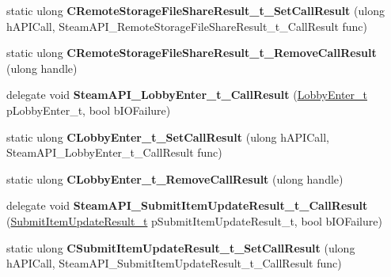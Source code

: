 \begin{DoxyCompactItemize}
static ulong {\bfseries C\+Remote\+Storage\+File\+Share\+Result\+\_\+t\+\_\+\+Set\+Call\+Result} (ulong h\+A\+P\+I\+Call, Steam\+A\+P\+I\+\_\+\+Remote\+Storage\+File\+Share\+Result\+\_\+t\+\_\+\+Call\+Result func)
\item 
\mbox{\label{class_valve_1_1_interop_1_1_native_entrypoints_ac74bc77f5f35daccabd8167b9524ffb6}} 
static ulong {\bfseries C\+Remote\+Storage\+File\+Share\+Result\+\_\+t\+\_\+\+Remove\+Call\+Result} (ulong handle)
\item 
\mbox{\label{class_valve_1_1_interop_1_1_native_entrypoints_ab5a7c805aee4dfdff70b06c193bd35ac}} 
delegate void {\bfseries Steam\+A\+P\+I\+\_\+\+Lobby\+Enter\+\_\+t\+\_\+\+Call\+Result} (\hyperlink{struct_valve_1_1_steamworks_1_1_lobby_enter__t}{Lobby\+Enter\+\_\+t} p\+Lobby\+Enter\+\_\+t, bool b\+I\+O\+Failure)
\item 
\mbox{\label{class_valve_1_1_interop_1_1_native_entrypoints_a61d9e30a20d74ba30295a18b9c1aa106}} 
static ulong {\bfseries C\+Lobby\+Enter\+\_\+t\+\_\+\+Set\+Call\+Result} (ulong h\+A\+P\+I\+Call, Steam\+A\+P\+I\+\_\+\+Lobby\+Enter\+\_\+t\+\_\+\+Call\+Result func)
\item 
\mbox{\label{class_valve_1_1_interop_1_1_native_entrypoints_a7c1ee930566b49979a38f19a1823bd55}} 
static ulong {\bfseries C\+Lobby\+Enter\+\_\+t\+\_\+\+Remove\+Call\+Result} (ulong handle)
\item 
\mbox{\label{class_valve_1_1_interop_1_1_native_entrypoints_a030dcd88e4578eb5c4a36da8b1d8e1cd}} 
delegate void {\bfseries Steam\+A\+P\+I\+\_\+\+Submit\+Item\+Update\+Result\+\_\+t\+\_\+\+Call\+Result} (\hyperlink{struct_valve_1_1_steamworks_1_1_submit_item_update_result__t}{Submit\+Item\+Update\+Result\+\_\+t} p\+Submit\+Item\+Update\+Result\+\_\+t, bool b\+I\+O\+Failure)
\item 
\mbox{\label{class_valve_1_1_interop_1_1_native_entrypoints_a7a3c74d1b37f01c7f08fd3691742ad0a}} 
static ulong {\bfseries C\+Submit\+Item\+Update\+Result\+\_\+t\+\_\+\+Set\+Call\+Result} (ulong h\+A\+P\+I\+Call, Steam\+A\+P\+I\+\_\+\+Submit\+Item\+Update\+Result\+\_\+t\+\_\+\+Call\+Result func)

\end{DoxyCompactItemize}
